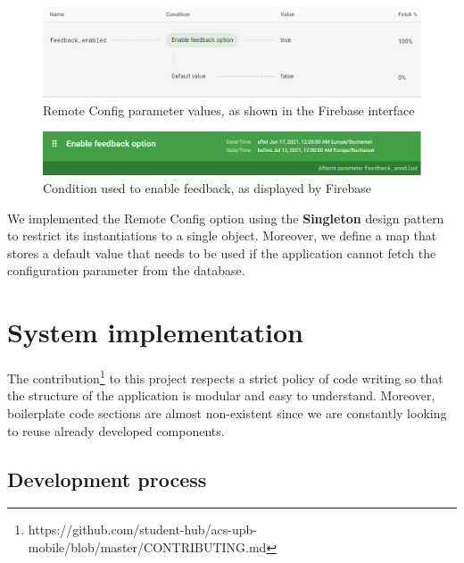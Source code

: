     \begin{figure}[!ht]
        \centering
         \includegraphics[width=1\textwidth]{figures/feedback_enabled.png}
         \caption{Remote Config parameter values, as shown in the Firebase interface}
        \label{5:fig:feedback_enabled}
    \end{figure}
    
    \clearpage
    
    \begin{figure}[!ht]
        \centering
         \includegraphics[width=1\textwidth]{figures/feedback_option.png}
         \caption{Condition used to enable feedback, as displayed by Firebase}
        \label{5:fig:feedback_option}
    \end{figure}
    
    We implemented the Remote Config option using the \textbf{Singleton} design pattern to restrict its instantiations to a single object. Moreover, we define a map that stores a default value that needs to be used if the application cannot fetch the configuration parameter from the database.

\section{System implementation} \label{5:system_implementation}

    The contribution\footnote{https://github.com/student-hub/acs-upb-mobile/blob/master/CONTRIBUTING.md} to this project respects a strict policy of code writing so that the structure of the application is modular and easy to understand. Moreover, boilerplate code sections are almost non-existent since we are constantly looking to reuse already developed components.

\subsection{Development process} \label{5:development_process}

